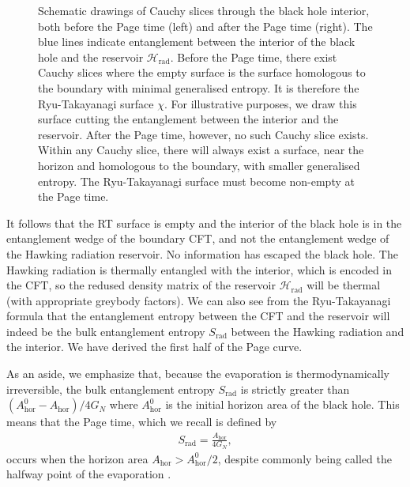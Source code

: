 \documentclass[11pt,a4paper]{article}
\newcommand{\Srad}{S_\text{rad} }
\begin{document}
\begin{figure}[t]
\begin{subfigure}{.48\textwidth}
\end{subfigure}
\centering
\caption{Schematic drawings of Cauchy slices through  the black hole interior, both before the Page time (left) and after the Page time (right). The blue lines indicate entanglement between the interior of the black hole and the reservoir $\mathcal{H}_\text{rad}$. Before the Page time, there exist Cauchy slices where the empty surface is the surface homologous to the boundary with minimal generalised entropy. It is therefore the Ryu-Takayanagi surface $\chi$. For illustrative purposes, we draw this surface cutting the entanglement between the interior and the reservoir. After the Page time, however, no such Cauchy slice exists. Within any Cauchy slice, there will always exist a surface, near the horizon and homologous to the boundary, with smaller generalised entropy. The Ryu-Takayanagi surface must become non-empty at the Page time.}
\label{fig:schematic}
\end{figure}

It follows that the RT surface is empty and the interior of the black hole is in the entanglement wedge of the boundary CFT, and not the entanglement wedge of the Hawking radiation reservoir. No information has escaped the black hole. The Hawking radiation is thermally entangled with the interior, which is encoded in the CFT, so the redused density matrix of the reservoir $\mathcal{H}_\text{rad}$ will be thermal (with appropriate greybody factors). We can also see from the Ryu-Takayanagi formula that the entanglement entropy between the CFT and the reservoir will indeed be the bulk entanglement entropy $\Srad$ between the Hawking radiation and the interior. We have derived the first half of the Page curve.

As an aside, we emphasize that, because the evaporation is thermodynamically irreversible, the bulk entanglement entropy $\Srad$ is strictly greater than $(A_\text{hor}^0 -  A_\text{hor})/ 4G_N$ where $A_\text{hor}^0$ is the initial horizon area of the black hole. This means that the Page time, which we recall is defined by 
\begin{align}
\Srad = \frac{A_\text{hor}} {4G_N},
\end{align}
occurs when the horizon area $A_\text{hor} > A_\text{hor}^0 /2$, despite commonly being called the halfway point of the evaporation \cite{page2013time}.
\end{document}
